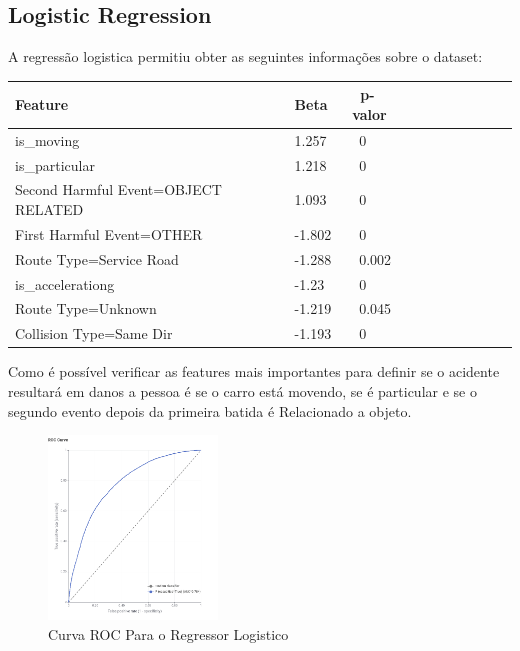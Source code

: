 \documentclass[conference]{IEEEtran}
\begin{document}
\subsection{Logistic Regression}
A regressão logistica permitiu obter as seguintes informações sobre o dataset:

\begin{table}[!ht]
    \centering
    \begin{tabular}{|l|l|l|l|l|l|l|l|l|l|}
    \hline
        Feature~ & Beta~ & ~p-valor  \\ \hline
        is\_moving~ &  1.257~ & ~0  \\ \hline
        is\_particular~ &  1.218~ & ~0  \\ \hline
        Second Harmful Event=OBJECT RELATED~ &  1.093~ & ~0  \\ \hline
        First Harmful Event=OTHER~ &  -1.802~ & ~0  \\ \hline
        Route Type=Service Road~ &  -1.288~ & ~0.002  \\ \hline
        is\_accelerationg~ &  -1.23~ & ~0  \\ \hline
        Route Type=Unknown~ &  -1.219~ & ~0.045  \\ \hline
        Collision Type=Same Dir~ &  -1.193~ & ~0  \\ \hline
    \end{tabular}
\end{table}

Como é possível verificar as features mais importantes para definir se o acidente resultará em danos a pessoa é 
se o carro está movendo, se é particular e se o segundo evento depois da primeira batida é Relacionado a objeto.

\begin{figure}[H]
    \centerline{\includegraphics[width=0.4\textwidth]{Images/roc-curve-regressor.png}}
    \caption{\label{fig:decision-tree} Curva ROC Para o Regressor Logistico}
\end{figure}
\end{document}
